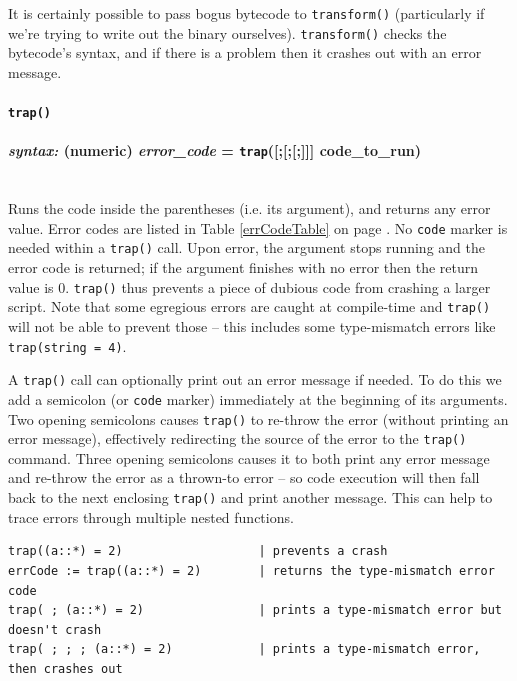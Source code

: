 \documentclass{article}
\newenvironment{code}{
       \begin{list}{}{
               \setlength{\leftmargin}{.4in}
               \setlength{\rightmargin}{0in}
               \setlength{\topsep}{.2in}
       }
       \small
       \item[] }
       { \end{list}   }
\begin{document}
It is certainly possible to pass bogus bytecode to \verb#transform()# (particularly if we're trying to write out the binary ourselves).  \verb#transform()# checks the bytecode's syntax, and if there is a problem then it crashes out with an error message.\\






\paragraph{\texttt{trap()}\\\\
\normalfont \emph{syntax: } (numeric) \emph{error\_code} = \texttt{trap}([;[;[;]]] code\_to\_run)\\\\}

Runs the code inside the parentheses (i.e. its argument), and returns any error value.  Error codes are listed in Table \ref{errCodeTable} on page \pageref{errCodeTable}.  No \texttt{code} marker is needed within a \texttt{trap()} call.  Upon error, the argument stops running and the error code is returned; if the argument finishes with no error then the return value is 0.  \verb#trap()# thus prevents a piece of dubious code from crashing a larger script.  Note that some egregious errors are caught at compile-time and \verb#trap()# will not be able to prevent those -- this includes some type-mismatch errors like \verb#trap(string = 4)#.

A \verb#trap()# call can optionally print out an error message if needed.  To do this we add a semicolon (or \verb#code# marker) immediately at the beginning of its arguments.  Two opening semicolons causes \verb#trap()# to re-throw the error (without printing an error message), effectively redirecting the source of the error to the \verb#trap()# command.  Three opening semicolons causes it to both print any error message and re-throw the error as a thrown-to error -- so code execution will then fall back to the next enclosing \verb#trap()# and print another message.  This can help to trace errors through multiple nested functions.

\begin{code} \begin{verbatim}
trap((a::*) = 2)                   | prevents a crash
errCode := trap((a::*) = 2)        | returns the type-mismatch error code
trap( ; (a::*) = 2)                | prints a type-mismatch error but doesn't crash
trap( ; ; ; (a::*) = 2)            | prints a type-mismatch error, then crashes out
\end{verbatim} \end{code}
\end{document}

